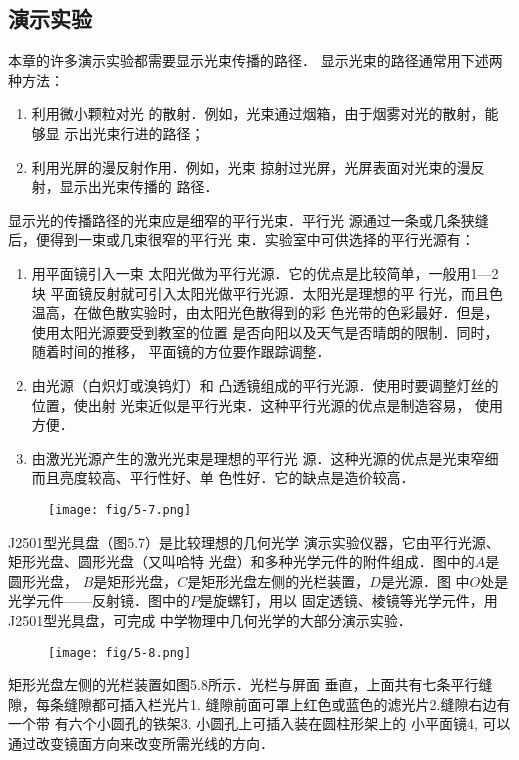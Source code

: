 \subsection{演示实验}

本章的许多演示实验都需要显示光束传播的路径．
显示光束的路径通常用下述两种方法：
\begin{enumerate}
\item 利用微小颗粒对光
的散射．例如，光束通过烟箱，由于烟雾对光的散射，能够显
示出光束行进的路径；
\item 利用光屏的漫反射作用．例如，光束
掠射过光屏，光屏表面对光束的漫反射，显示出光束传播的
路径．
\end{enumerate}

显示光的传播路径的光束应是细窄的平行光束．平行光
源通过一条或几条狭缝后，便得到一束或几束很窄的平行光
束．实验室中可供选择的平行光源有：
\begin{enumerate}
\item 用平面镜引入一束
太阳光做为平行光源．它的优点是比较简单，一般用1—2块
平面镜反射就可引入太阳光做平行光源．太阳光是理想的平
行光，而且色温高，在做色散实验时，由太阳光色散得到的彩
色光带的色彩最好．但是，使用太阳光源要受到教室的位置
是否向阳以及天气是否晴朗的限制．同时，随着时间的推移，
平面镜的方位要作跟踪调整．
    \item 由光源（白炽灯或溴钨灯）和
凸透镜组成的平行光源．使用时要调整灯丝的位置，使出射
光束近似是平行光束．这种平行光源的优点是制造容易，
使用方便．
    \item 由激光光源产生的激光光束是理想的平行光
源．这种光源的优点是光束窄细而且亮度较高、平行性好、单
色性好．它的缺点是造价较高．
\end{enumerate}

\begin{figure}[htp]
    \centering
    \texttt{[image: fig/5-7.png]}
    \caption{}
\end{figure}

J2501型光具盘（图5.7）是比较理想的几何光学
演示实验仪器，它由平行光源、矩形光盘、圆形光盘（又叫哈特
光盘）和多种光学元件的附件组成．图中的$A$是圆形光盘，
$B$是矩形光盘，$C$是矩形光盘左侧的光栏装置，$D$是光源．图
中$O$处是光学元件——反射镜．图中的$P$是旋螺钉，用以
固定透镜、棱镜等光学元件，用J2501型光具盘，可完成
中学物理中几何光学的大部分演示实验．

\begin{figure}[htp]
    \centering
    \texttt{[image: fig/5-8.png]}
    \caption{}
\end{figure}

矩形光盘左侧的光栏装置如图5.8所示．光栏与屏面
垂直，上面共有七条平行缝隙，每条缝隙都可插入栏光片1. 
缝隙前面可罩上红色或蓝色的滤光片2.缝隙右边有一个带
有六个小圆孔的铁架3. 小圆孔上可插入装在圆柱形架上的
小平面镜4, 可以通过改变镜面方向来改变所需光线的方向．


